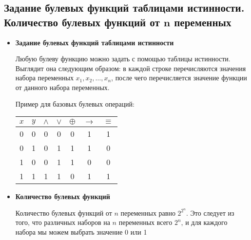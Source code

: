 \subsection{Задание булевых функций таблицами истинности. Количество булевых функций от $\boldsymbol{n}$ переменных}

\begin{itemize}
	\item \textbf{Задание булевых функций таблицами истинности}

	Любую булеву функцию можно задать с помощью таблицы истинности. Выглядит она следующим образом: в каждой строке перечисляются значения набора переменных $x_1, x_2, \ldots, x_n$, после чего перечисляется значение функции от данного набора переменных.
	
	Пример для базовых булевых операций:

   \begin{tabular}{|c|c|c|c|c|c|c|}
       \hline
       $x$ & $y$ & $\wedge$ & $\vee$ & $\oplus$ & $\to$ & $\equiv$\\
       \hline
       0 & 0 & 0 & 0 & 0 & 1 & 1 \\
       \hline
       0 & 1 & 0 & 1 & 1 & 1 & 0 \\
       \hline
       1 & 0 & 0 & 1 & 1 & 0 & 0 \\
       \hline
       1 & 1 & 1 & 1 & 0 & 1 & 1 \\
       \hline
   \end{tabular}

	\item \textbf{Количество булевых функций}
	
	Количество булевых функций от $n$ переменных равно $2^{2^n}$. Это следует из того, что различных наборов на $n$ переменных всего $2^n$, и для каждого набора мы можем выбрать значение 0 или 1
\end{itemize}